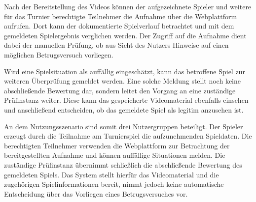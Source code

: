 Nach der Bereitstellung des Videos können der aufgezeichnete Spieler und weitere für das Turnier berechtigte Teilnehmer die Aufnahme über die Webplattform aufrufen. Dort kann der dokumentierte Spielverlauf betrachtet und mit dem gemeldeten Spielergebnis verglichen werden. 
Der Zugriff auf die Aufnahme dient dabei der manuellen Prüfung, ob aus Sicht des Nutzers Hinweise auf einen möglichen Betrugsversuch vorliegen. 

Wird eine Spielsituation als auffällig eingeschätzt, kann das betroffene Spiel zur weiteren Überprüfung gemeldet werden. Eine solche Meldung stellt noch keine abschließende Bewertung dar, sondern leitet den Vorgang an eine zuständige Prüfinstanz weiter. 
Diese kann das gespeicherte Videomaterial ebenfalls einsehen und anschließend entscheiden, ob das gemeldete Spiel als legitim anzusehen ist. 

An dem Nutzungsszenario sind somit drei Nutzergruppen beteiligt. Der Spieler erzeugt durch die Teilnahme am Turnierspiel die aufzunehmenden Spieldaten. Die berechtigten Teilnehmer verwenden die Webplattform zur Betrachtung der bereitgestellten Aufnahme und können auffällige Situationen melden. 
Die zuständige Prüfinstanz übernimmt schließlich die abschließende Bewertung des gemeldeten Spiels. Das System stellt hierfür das Videomaterial und die zugehörigen Spielinformationen bereit, nimmt jedoch keine automatische Entscheidung über das Vorliegen eines Betrugsversuches vor.

\newpage